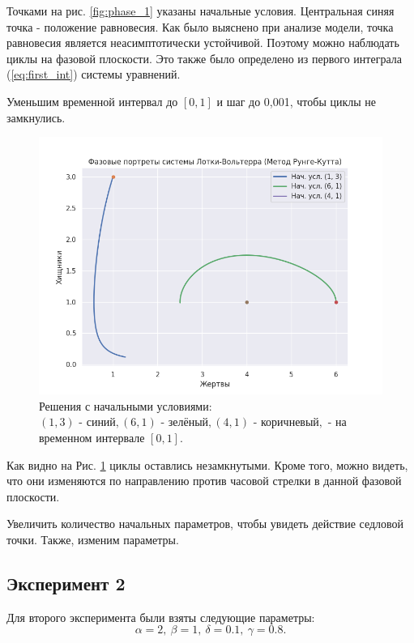 Точками на рис. \ref{fig:phase_1} указаны начальные условия. Центральная синяя точка - положение равновесия. Как было выяснено при анализе модели, точка равновесия является неасимптотически устойчивой. Поэтому можно наблюдать циклы на фазовой плоскости. Это также было определено из первого интеграла (\ref{eq:first_int}) системы уравнений.

Уменьшим временной интервал до $[0,1]$ и шаг до 0,001, чтобы циклы не замкнулись.
\begin{figure}[h]  %
	\centering
	\includegraphics[width=1\textwidth]{imgs/phase_1_1.png}  %
	\caption{Решения с начальными условиями: $(1,3)\text{ - синий}, (6,1)\text{ - зелёный}, (4,1)\text{ - коричневый}, $ - на временном интервале $[0,1]$.}  %
	\label{fig:phase_1_1}  %
\end{figure}

Как видно на Рис. \ref{fig:phase_1_1} циклы оставлись незамкнутыми. Кроме того, можно видеть, что они изменяются по направлению против часовой стрелки в данной фазовой плоскости.

Увеличить количество начальных параметров, чтобы увидеть действие седловой точки. Также, изменим параметры.
\newpage
\subsection*{Эксперимент 2}
Для второго эксперимента были взяты следующие параметры: $$\alpha = 2, \ \beta = 1, \ \delta = 0.1, \ \gamma = 0.8.$$

